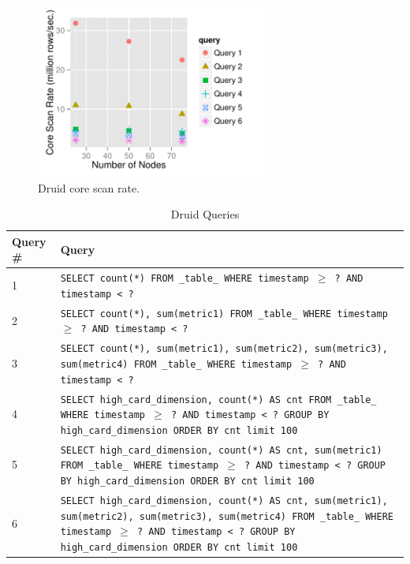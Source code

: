 \documentclass{vldb}
\begin{document}
\begin{figure}
\centering
\includegraphics[width = 3in]{core_scan_rate}
\caption{Druid core scan rate.}
\label{fig:core_scan_rate}
\end{figure}

\begin{table}
  \centering
  \caption{Druid Queries}
  \label{tab:sql_queries}
  \begin{tabular}{| l | p{15cm} |}
    \hline
    \textbf{Query \#} & \textbf{Query} \\ \hline
    1 & \texttt{SELECT count(*) FROM \_table\_ WHERE timestamp $\geq$ ? AND timestamp < ?} \\ \hline
    2 & \texttt{SELECT count(*), sum(metric1) FROM \_table\_ WHERE timestamp $\geq$ ? AND timestamp < ?} \\ \hline
    3 & \texttt{SELECT count(*), sum(metric1), sum(metric2), sum(metric3), sum(metric4) FROM \_table\_ WHERE timestamp $\geq$ ? AND timestamp < ?} \\ \hline
    4 & \texttt{SELECT high\_card\_dimension, count(*) AS cnt FROM \_table\_ WHERE timestamp $\geq$ ? AND timestamp < ? GROUP BY high\_card\_dimension ORDER BY cnt limit 100} \\ \hline
    5 & \texttt{SELECT high\_card\_dimension, count(*) AS cnt, sum(metric1) FROM \_table\_ WHERE timestamp $\geq$ ? AND timestamp < ? GROUP BY high\_card\_dimension ORDER BY cnt limit 100} \\ \hline
    6 & \texttt{SELECT high\_card\_dimension, count(*) AS cnt, sum(metric1), sum(metric2), sum(metric3), sum(metric4) FROM \_table\_ WHERE timestamp $\geq$ ? AND timestamp < ? GROUP BY high\_card\_dimension ORDER BY cnt limit 100} \\ \hline
  \end{tabular}
\end{table}
\end{document}
